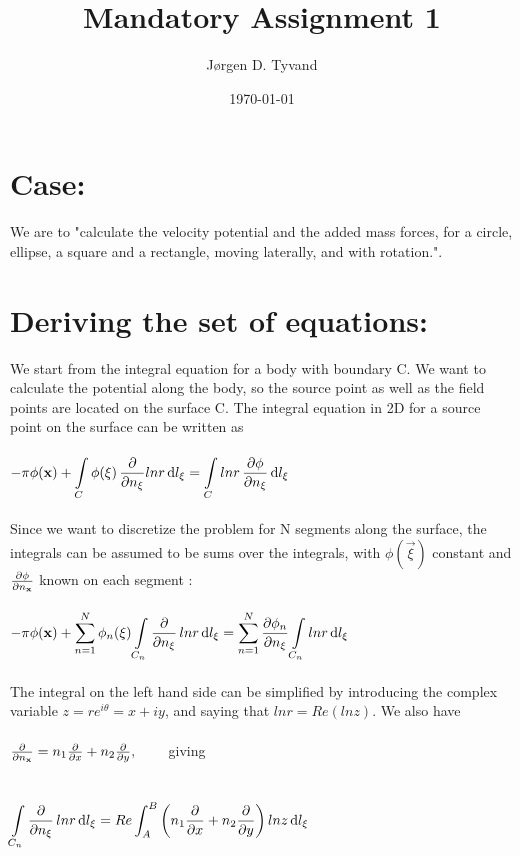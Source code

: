 \documentclass[a4paper,english,11pt,twoside]{article}
\date{\today}
\title{Mandatory Assignment 1}
\author{Jørgen D. Tyvand}
\newcommand{\tab}{\hspace*{2em}}
\begin{document}
\maketitle
\newpage

\section*{Case:}
We are to "calculate the velocity potential and the added mass forces, for a circle, ellipse, a square and a rectangle, moving laterally, and with rotation.". 
\section*{Deriving the set of equations:}
We start from the integral equation for a body with boundary C. We want to calculate the potential along the body, so the source point as well as the field points are located on the surface C. The integral equation in 2D for a source point on the surface can be written as\\
\\
$-\pi\phi(\mathbf{x}) +\displaystyle\int\limits_C\phi(\mathbf{\xi})\, \frac{\partial }{\partial n_{\mathbf{\xi}}}lnr\, \mathrm{d}l_{\mathbf{\xi}} = \int\limits_Clnr\, \frac{\partial \phi}{\partial n_{\mathbf{\xi}}}\, \mathrm{d}l_{\mathbf{\xi}}$\\
\\
Since we want to discretize the problem for N segments along the surface, the integrals can be assumed to be sums over the integrals, with $\phi(\vec{\xi})$ constant and $\frac{\partial \phi}{\partial n_{\mathbf{x}}}$ known on each segment :\\
\\
$-\pi\phi(\mathbf{x}) +\displaystyle\sum_{n=1}^{N}\phi_n(\mathbf{\xi})\int\limits_{C_n}\frac{\partial }{\partial n_{\mathbf{\xi}}}\, lnr\, \mathrm{d}l_{\mathbf{\xi}} = \sum_{n=1}^{N} \frac{\partial \phi_n}{\partial n_{\mathbf{\xi}}}\int\limits_{C_n} lnr\, \mathrm{d}l_{\mathbf{\xi}}$\\
\\
The integral on the left hand side can be simplified by introducing the complex variable $z = r e^{i\theta} = x + iy$, and saying that $lnr = Re(lnz)$. We also have\\
\\
$\pdi{}{n_\vec{x}} = n_1\pdi{}{x} + n_2\pdi{}{y}, \tab$ giving\\
\\
\\
$\displaystyle\int\limits_{C_n}\frac{\partial }{\partial n_{\mathbf{\xi}}}\, lnr\, \mathrm{d}l_{\mathbf{\xi}} = Re\displaystyle\int_A^B\left(n_1\frac{\partial }{\partial x} + n_2\frac{\partial }{\partial y}\right)lnz\, \mathrm{d}l_{\mathbf{\xi}}$\\
\end{document}
